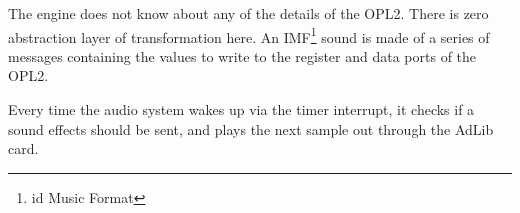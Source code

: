 \documentclass[book.tex]{subfiles}
\begin{document}
\par
The engine does not know about any of the details of the OPL2. There is zero abstraction layer of transformation here. An IMF\footnote{id Music Format} sound is made of a series of messages containing the values to write to the register and data ports of the OPL2.\\

\par
Every time the audio system wakes up via the timer interrupt, it checks if a sound effects should be sent, and plays the next sample out through the AdLib card.\\

\par
\begin{minipage}{\textwidth}

\end{minipage}
\par
\end{document}
